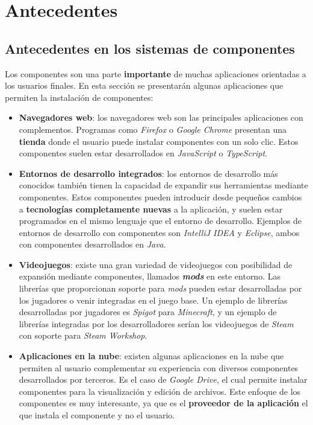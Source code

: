 \chapter{Antecedentes}\label{ch:antecedentes}

\section{Antecedentes en los sistemas de componentes}
\label{sec:antecedentes-en-los-sistemas-de-componentes}

Los componentes son una parte \textbf{importante} de muchas aplicaciones
orientadas a los usuarios finales.
En esta sección se presentarán algunas aplicaciones que permiten
la instalación de componentes:

\begin{itemize}
    \item \textbf{Navegadores web}: los navegadores web
    son las principales aplicaciones con complementos.
    Programas como \textit{Firefox}\cite{FIREFOX} o
    \textit{Google Chrome}\cite{CHROME}
    presentan una \textbf{tienda} donde el usuario puede instalar
    componentes con un solo clic.
    Estos componentes suelen estar desarrollados en \textit{JavaScript}
    o \textit{TypeScript}.
    \item \textbf{Entornos de desarrollo integrados}: los entornos de
    desarrollo más conocidos también tienen la capacidad de expandir
    sus herramientas mediante componentes.
    Estos componentes pueden introducir desde pequeños cambios
    a \textbf{tecnologías completamente nuevas} a la aplicación, y suelen
    estar programados en el mismo lenguaje que el entorno de desarrollo.
    Ejemplos de entornos de desarrollo con componentes
    son \textit{IntelliJ IDEA}\cite{INTELLIJIDEA} y \textit{Eclipse}\cite{ECLIPSE},
    ambos con componentes desarrollados en \textit{Java}\cite{JAVA}.
    \item \textbf{Videojuegos}: existe una gran variedad
    de videojuegos con posibilidad de expansión mediante
    componentes, llamados \textit{\textbf{mods}} en este entorno.
    Las librerías que proporcionan soporte para \textit{mods}
    pueden estar desarrolladas por los jugadores o venir
    integradas en el juego base.
    Un ejemplo de librerías desarrolladas por jugadores es
    \textit{Spigot}\cite{SPIGOT} para \textit{Minecraft}, y un ejemplo
    de librerías integradas por los desarrolladores
    serían los videojuegos de \textit{Steam} con soporte
    para \textit{Steam Workshop}\cite{STEAM_WORKSHOP}.
    \item \textbf{Aplicaciones en la nube}: existen
    algunas aplicaciones en la nube que permiten
    al usuario complementar su experiencia con diversos
    componentes desarrollados por terceros.
    Es el caso de \textit{Google Drive}, el cual permite
    instalar componentes para la visualización y
    edición de archivos.
    Este enfoque de los componentes es muy interesante,
    ya que es el \textbf{proveedor de la aplicación} el que
    instala el componente y no el usuario.
\end{itemize}


